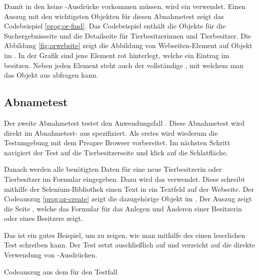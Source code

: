 \SuperPar
Damit in den  keine -Ausdrücke vorkommen müssen, wird ein  verwendet. Einen Auszug mit den wichtigsten Objekten für diesen Abnahmetest zeigt das Codebeispiel \ref{prog:or-find}. Das Codebeispiel enthält die Objekte für die Suchergebnisseite und die Detailseite für Tierbesitzerinnen und Tierbesitzer. Die Abbildung \ref{fig:orwebsite} zeigt die Abbildung von Webseiten-Element auf Objekt im . In der Grafik sind jene Element rot hinterlegt, welche ein Eintrag im  besitzen. Neben jeden Element steht auch der vollständige , mit welchem man das Objekt aus  abfragen kann.


\subsection{Abnametest }
\label{cha:TestenUA2}


Der zweite Abnahmetest testet den Anwendungsfall . Diese Abnahmetest wird direkt im Abnahmetest- aus spezifiziert. Als erstes wird wiederum die Testumgebung mit dem  {Preapre Browser} vorbereitet. Im nächsten Schritt navigiert der Test auf die Tierbesitzerseite und klick auf die  Schlatfläche. 


\SuperPar
Danach werden alle benötigten Daten für eine neue Tierbesitzerin oder Tierbesitzer im Formular eingegeben. Dazu wird das   verwendet. Diese  schreibt mithilfe der Selenium-Bibliothek einen Text in ein Textfeld auf der Webseite. Der Codeauszug \ref{prog:or-create} zeigt die dazugehörige Objekt im .  Der Auszug zeigt die Seite , welche das Formular für das Anlegen und Änderen einer Besitzerin oder eines Besitzers zeigt.

\SuperPar
Das   ist ein gutes Beispiel, um zu zeigen, wie man mithilfe des  einen leserlichen Test schreiben kann. Der Test setzt auschließlich auf   und verzeicht auf die direkte Verwendung von -Ausdrücken. 

\begin{program}

\caption{Codeauszug aus dem  für den Testfall }
\label{prog:or-create}
\end{program}

